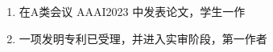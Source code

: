 \cleardoublepage
{}

{%
    \begin{enumerate}
        \item 在A类会议 AAAI2023 中发表论文，学生一作
        \item 一项发明专利已受理，并进入实审阶段，第一作者
    \end{enumerate}
}
{%
   

 
}